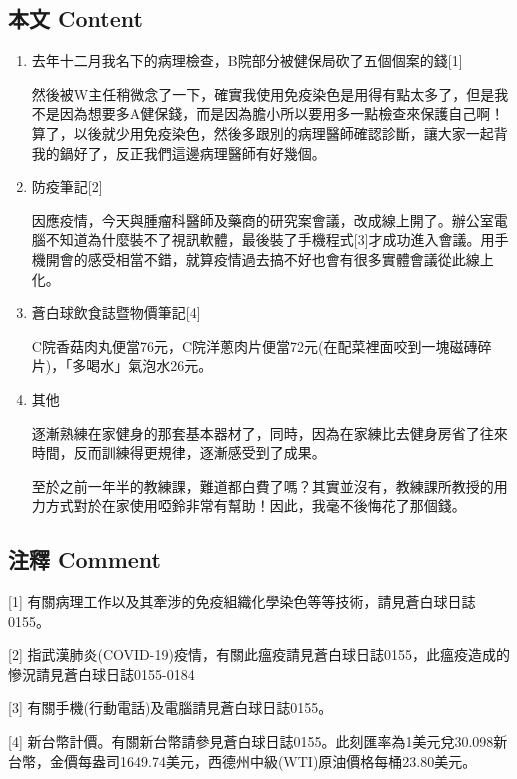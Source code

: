 \documentclass[a5paper, 12pt
]{book}
\begin{document}
\hypertarget{ux672cux6587-content-38}{%
\subsection{本文 Content}\label{ux672cux6587-content-38}}

\begin{enumerate}
\def\labelenumi{\arabic{enumi}.}
\item
  去年十二月我名下的病理檢查，B院部分被健保局砍了五個個案的錢{[}1{]}

  然後被W主任稍微念了一下，確實我使用免疫染色是用得有點太多了，但是我不是因為想要多A健保錢，而是因為膽小所以要用多一點檢查來保護自己啊！算了，以後就少用免疫染色，然後多跟別的病理醫師確認診斷，讓大家一起背我的鍋好了，反正我們這邊病理醫師有好幾個。
\item
  防疫筆記{[}2{]}

  因應疫情，今天與腫瘤科醫師及藥商的研究案會議，改成線上開了。辦公室電腦不知道為什麼裝不了視訊軟體，最後裝了手機程式{[}3{]}才成功進入會議。用手機開會的感受相當不錯，就算疫情過去搞不好也會有很多實體會議從此線上化。
\item
  蒼白球飲食誌暨物價筆記{[}4{]}

  C院香菇肉丸便當76元，C院洋蔥肉片便當72元(在配菜裡面咬到一塊磁磚碎片)，「多喝水」氣泡水26元。
\item
  其他

  逐漸熟練在家健身的那套基本器材了，同時，因為在家練比去健身房省了往來時間，反而訓練得更規律，逐漸感受到了成果。

  至於之前一年半的教練課，難道都白費了嗎？其實並沒有，教練課所教授的用力方式對於在家使用啞鈴非常有幫助！因此，我毫不後悔花了那個錢。
\end{enumerate}

\hypertarget{ux6ce8ux91cb-comment-38}{%
\subsection{注釋 Comment}\label{ux6ce8ux91cb-comment-38}}

{[}1{]}
有關病理工作以及其牽涉的免疫組織化學染色等等技術，請見蒼白球日誌0155。

{[}2{]}
指武漢肺炎(COVID-19)疫情，有關此瘟疫請見蒼白球日誌0155，此瘟疫造成的慘況請見蒼白球日誌0155-0184

{[}3{]} 有關手機(行動電話)及電腦請見蒼白球日誌0155。

{[}4{]}
新台幣計價。有關新台幣請參見蒼白球日誌0155。此刻匯率為1美元兌30.098新台幣，金價每盎司1649.74美元，西德州中級(WTI)原油價格每桶23.80美元。
\end{document}
